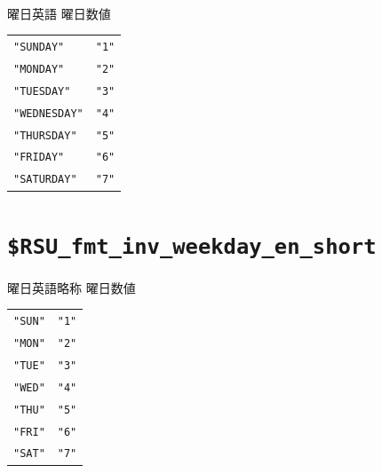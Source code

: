 \paragraph{\DocStrTitleRDMPredefinedFormatConversion}曜日英語  曜日数値
\begin{center}
\begin{xltabular}{\textwidth}{|p{7truecm}|X|}
\hline
\thead{\DocStrHeaderFormatInput}&\thead{\DocStrHeaderFormatOutput}\\
\hline
\hline
\texttt{"SUNDAY"}&\texttt{"1"}\\
\hline
\texttt{"MONDAY"}&\texttt{"2"}\\
\hline
\texttt{"TUESDAY"}&\texttt{"3"}\\
\hline
\texttt{"WEDNESDAY"}&\texttt{"4"}\\
\hline
\texttt{"THURSDAY"}&\texttt{"5"}\\
\hline
\texttt{"FRIDAY"}&\texttt{"6"}\\
\hline
\texttt{"SATURDAY"}&\texttt{"7"}\\
\hline
\end{xltabular}
\end{center}
\section{\texttt{\$RSU\_fmt\_inv\_weekday\_en\_short}}
\paragraph{\DocStrTitleRDMPredefinedFormatConversion}曜日英語略称  曜日数値
\begin{center}
\begin{xltabular}{\textwidth}{|p{7truecm}|X|}
\hline
\thead{\DocStrHeaderFormatInput}&\thead{\DocStrHeaderFormatOutput}\\
\hline
\hline
\texttt{"SUN"}&\texttt{"1"}\\
\hline
\texttt{"MON"}&\texttt{"2"}\\
\hline
\texttt{"TUE"}&\texttt{"3"}\\
\hline
\texttt{"WED"}&\texttt{"4"}\\
\hline
\texttt{"THU"}&\texttt{"5"}\\
\hline
\texttt{"FRI"}&\texttt{"6"}\\
\hline
\texttt{"SAT"}&\texttt{"7"}\\
\hline
\end{xltabular}
\end{center}
